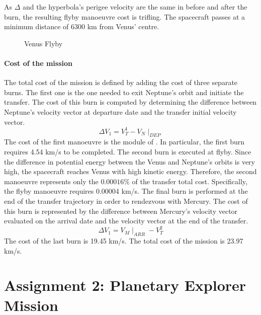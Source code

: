 \documentclass[11pt,a4paper]{report}
\begin{document}
As \textbf{$\Delta$} and the hyperbola's perigee velocity are the same in before and after the burn, the resulting flyby manoeuvre cost is trifling.
The spacecraft passes at a minimum distance of 6300 km from Venus’ centre.

\begin{figure}[H]
\centering
{}
    \caption{Venus Flyby}
\end{figure}

\subsection{Cost of the mission}

The total cost of the mission is defined by adding the cost of three separate burns. 
The first one is the one needed to exit Neptune’s orbit and initiate the transfer. The cost of this burn is computed by determining the difference between Neptune’s velocity vector at departure date and the transfer initial velocity vector.
\begin{equation*}
    \Delta V_1 = V_T^1 - V_{N}\mid_{DEP}
\end{equation*}
The cost of the first manoeuvre is the module of . In particular, the first burn requires 4.54 km/s to be completed.
The second burn is executed at flyby. Since the difference in potential energy between the Venus and Neptune’s orbits is very high, the spacecraft reaches Venus with high kinetic energy. Therefore, the second manoeuvre represents only the $0.00016\%$ of the transfer total cost. Specifically, the flyby manoeuvre requires 0.00004 km/s.
The final burn is performed at the end of the transfer trajectory in order to rendezvous with Mercury. The cost of this burn is represented by the difference between Mercury’s velocity vector evaluated on the arrival date and the velocity vector at the end of the transfer.
\begin{equation*}
    \Delta V_1 = V_{M}\mid_{ARR}- V_T^2
\end{equation*}
The cost of the last burn is 19.45 km/s.
The total cost of the mission is 23.97 km/s.

\part{Assignment 2: Planetary Explorer Mission}
\end{document}
